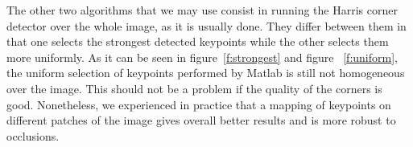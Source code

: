 The other two algorithms that we may use consist in running the Harris corner detector over the whole image, as it is usually done. They differ between them in that one selects the strongest detected keypoints while the other selects them more uniformly. As it can be seen in figure~\ref{f:strongest} and figure ~\ref{f:uniform}, the uniform selection of keypoints performed by Matlab is still not homogeneous over the image.
This should not be a problem if the quality of the corners is good. Nonetheless, we experienced in practice that a mapping of keypoints on different
patches of the image gives overall better results and is more robust to occlusions.
